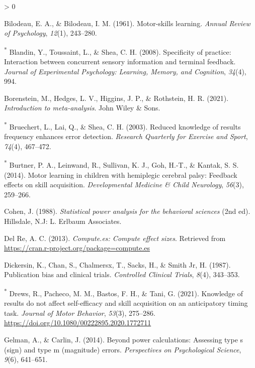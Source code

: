 \documentclass[
  english,
  man, donotrepeattitle,floatsintext]{apa7}
\newlength{\cslhangindent}
\newenvironment{CSLReferences}[2] %
 {%
  \setlength{\parindent}{0pt}
  \ifodd #1 \everypar{\setlength{\hangindent}{\cslhangindent}}\ignorespaces\fi
  \ifnum #2 > 0
  \setlength{\parskip}{#2\baselineskip}
  \fi
 }%
 {}
\begin{document}
\begin{CSLReferences}{1}{0}
\leavevmode\hypertarget{ref-Bilodeau1961}{}%
Bilodeau, E. A., \& Bilodeau, I. M. (1961). Motor-skills learning. \emph{Annual Review of Psychology}, \emph{12}(1), 243--280.

\leavevmode\hypertarget{ref-Blandin2008}{}%
\textsuperscript{*} Blandin, Y., Toussaint, L., \& Shea, C. H. (2008). Specificity of practice: Interaction between concurrent sensory information and terminal feedback. \emph{Journal of Experimental Psychology: Learning, Memory, and Cognition}, \emph{34}(4), 994.

\leavevmode\hypertarget{ref-Borenstein2021}{}%
Borenstein, M., Hedges, L. V., Higgins, J. P., \& Rothstein, H. R. (2021). \emph{Introduction to meta-analysis}. John Wiley \& Sons.

\leavevmode\hypertarget{ref-Bruechert2003}{}%
\textsuperscript{*} Bruechert, L., Lai, Q., \& Shea, C. H. (2003). Reduced knowledge of results frequency enhances error detection. \emph{Research Quarterly for Exercise and Sport}, \emph{74}(4), 467--472.

\leavevmode\hypertarget{ref-Burtner2014}{}%
\textsuperscript{*} Burtner, P. A., Leinwand, R., Sullivan, K. J., Goh, H.-T., \& Kantak, S. S. (2014). Motor learning in children with hemiplegic cerebral palsy: Feedback effects on skill acquisition. \emph{Developmental Medicine \& Child Neurology}, \emph{56}(3), 259--266.

\leavevmode\hypertarget{ref-Cohen1988}{}%
Cohen, J. (1988). \emph{Statistical power analysis for the behavioral sciences} (2nd ed). Hillsdale, N.J: L. Erlbaum Associates.

\leavevmode\hypertarget{ref-DelRe2013}{}%
Del Re, A. C. (2013). \emph{Compute.es: Compute effect sizes}. Retrieved from \url{https://cran.r-project.org/package=compute.es}

\leavevmode\hypertarget{ref-Dickersin1987}{}%
Dickersin, K., Chan, S., Chalmersx, T., Sacks, H., \& Smith Jr, H. (1987). Publication bias and clinical trials. \emph{Controlled Clinical Trials}, \emph{8}(4), 343--353.

\leavevmode\hypertarget{ref-Drews2021}{}%
\textsuperscript{*} Drews, R., Pacheco, M. M., Bastos, F. H., \& Tani, G. (2021). Knowledge of results do not affect self-efficacy and skill acquisition on an anticipatory timing task. \emph{Journal of Motor Behavior}, \emph{53}(3), 275--286. \url{https://doi.org/10.1080/00222895.2020.1772711}

\leavevmode\hypertarget{ref-Gelman2014}{}%
Gelman, A., \& Carlin, J. (2014). Beyond power calculations: Assessing type s (sign) and type m (magnitude) errors. \emph{Perspectives on Psychological Science}, \emph{9}(6), 641--651.


\end{CSLReferences}
\end{document}
